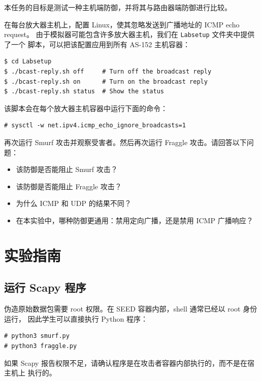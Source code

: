 本任务的目标是测试一种主机端防御，并将其与路由器端防御进行比较。


在每台放大器主机上，配置 Linux，使其忽略发送到广播地址的 ICMP echo request。
由于模拟器可能包含许多放大器主机，我们在 \texttt{Labsetup} 文件夹中提供了一个
脚本，可以把该配置应用到所有 AS-152 主机容器：

\begin{lstlisting}
$ cd Labsetup
$ ./bcast-reply.sh off     # Turn off the broadcast reply 
$ ./bcast-reply.sh on      # Turn on the broadcast reply 
$ ./bcast-reply.sh status  # Show the status
\end{lstlisting}

该脚本会在每个放大器主机容器中运行下面的命令：

\begin{lstlisting}
# sysctl -w net.ipv4.icmp_echo_ignore_broadcasts=1
\end{lstlisting}

再次运行 Smurf 攻击并观察受害者。然后再次运行 Fraggle 攻击。请回答以下问题：

\begin{itemize}[noitemsep]
\item 该防御是否能阻止 Smurf 攻击？
\item 该防御是否能阻止 Fraggle 攻击？
\item 为什么 ICMP 和 UDP 的结果不同？
\item 在本实验中，哪种防御更通用：禁用定向广播，还是禁用 ICMP 广播响应？
\end{itemize}


\section{实验指南}

\subsection{运行 Scapy 程序}

伪造原始数据包需要 root 权限。在 SEED 容器内部，shell 通常已经以 root 身份运行，
因此学生可以直接执行 Python 程序：

\begin{lstlisting}
# python3 smurf.py
# python3 fraggle.py
\end{lstlisting}

如果 Scapy 报告权限不足，请确认程序是在攻击者容器内部执行的，而不是在宿主机上
执行的。


